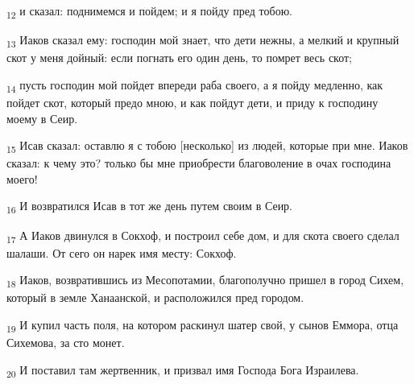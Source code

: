 \begin{tcolorbox}
\textsubscript{12} и сказал: поднимемся и пойдем; и я пойду пред тобою.
\end{tcolorbox}
\begin{tcolorbox}
\textsubscript{13} Иаков сказал ему: господин мой знает, что дети нежны, а мелкий и крупный скот у меня дойный: если погнать его один день, то помрет весь скот;
\end{tcolorbox}
\begin{tcolorbox}
\textsubscript{14} пусть господин мой пойдет впереди раба своего, а я пойду медленно, как пойдет скот, который предо мною, и как пойдут дети, и приду к господину моему в Сеир.
\end{tcolorbox}
\begin{tcolorbox}
\textsubscript{15} Исав сказал: оставлю я с тобою [несколько] из людей, которые при мне. Иаков сказал: к чему это? только бы мне приобрести благоволение в очах господина моего!
\end{tcolorbox}
\begin{tcolorbox}
\textsubscript{16} И возвратился Исав в тот же день путем своим в Сеир.
\end{tcolorbox}
\begin{tcolorbox}
\textsubscript{17} А Иаков двинулся в Сокхоф, и построил себе дом, и для скота своего сделал шалаши. От сего он нарек имя месту: Сокхоф.
\end{tcolorbox}
\begin{tcolorbox}
\textsubscript{18} Иаков, возвратившись из Месопотамии, благополучно пришел в город Сихем, который в земле Ханаанской, и расположился пред городом.
\end{tcolorbox}
\begin{tcolorbox}
\textsubscript{19} И купил часть поля, на котором раскинул шатер свой, у сынов Еммора, отца Сихемова, за сто монет.
\end{tcolorbox}
\begin{tcolorbox}
\textsubscript{20} И поставил там жертвенник, и призвал имя Господа Бога Израилева.
\end{tcolorbox}
